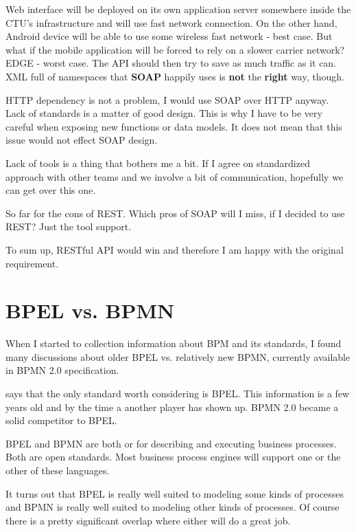 	Web interface will be deployed on its own application server somewhere inside the CTU's infrastructure and will use
	fast network connection. On the other hand, Android device will be able to use some wireless fast network - best case.
	But what if the mobile application will be forced to rely on a slower carrier network? EDGE - worst case. The API
	should then try to save as much traffic as it can. XML full of namespaces that \textbf{SOAP} happily uses is
	\textbf{not} the \textbf{right} way, though.
	
	HTTP dependency is not a problem, I would use SOAP over HTTP anyway. Lack of standards is a matter of good design. This
	is why I have to be very careful when exposing new functions or data models. It does not mean that this issue would not
	effect SOAP design.
	
	Lack of tools is a thing that bothers me a bit. If I agree on standardized approach with other teams and we involve a
	bit of communication, hopefully we can get over this one.
	
	So far for the cons of REST. Which pros of SOAP will I miss, if I decided to use REST? Just the tool support.
	
	To sum up, RESTful API would win and therefore I am happy with the original requirement.
	
	\section{BPEL vs. BPMN}
	
	When I started to collection information about BPM and its standards, I found many discussions about older BPEL vs.
	relatively new BPMN, currently available in BPMN 2.0 specification.
	
	\cite{bpm} says that the only standard worth considering is BPEL. This information is a few years old and by the time a
	another player has shown up. BPMN 2.0 became a solid competitor to BPEL.
	
	\cite{oracle_architecture_standards}
	BPEL and BPMN are both  or  for describing and executing business processes. Both are open
	standards. Most business process engines will support one or the other of these languages.
	
	It turns out that BPEL is really well suited to modeling some kinds of processes and BPMN is really well suited to
	modeling other kinds of processes. Of course there is a pretty significant overlap where either will do a great job.
	
